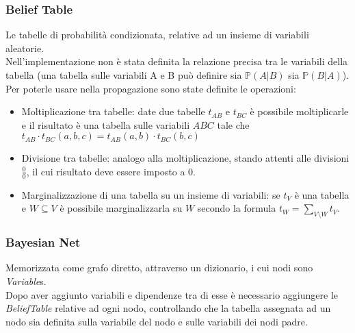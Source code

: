 \documentclass[a4paper]{article}
\begin{document}
\subsubsection{Belief Table}
Le tabelle di probabilità condizionata, relative ad un insieme di variabili aleatorie.\\
Nell'implementazione non è stata definita la relazione precisa tra le variabili della tabella (una tabella sulle variabili A e B può definire sia $\mathbb{P}(A|B)$ sia $\mathbb{P}(B|A)$).\\
Per poterle usare nella propagazione sono state definite le operazioni:
\begin{itemize}
\item Moltiplicazione tra tabelle: date due tabelle $t_{AB}$ e $t_{BC}$ è possibile moltiplicarle e il risultato è una tabella sulle variabili $ABC$ tale che $t_{AB}\cdot t_{BC}(a,b,c)=t_{AB}(a,b)\cdot t_{BC}(b,c)$
\item Divisione tra tabelle: analogo alla moltiplicazione, stando attenti alle divisioni $\frac{0}{0}$, il cui risultato deve essere imposto a 0.
\item Marginalizzazione di una tabella su un insieme di variabili: se $t_V$ è una tabella e $W\subseteq V$ è possibile marginalizzarla su $W$ secondo la formula $t_W = \sum_{V\setminus W}t_V$.
\end{itemize}
\subsubsection{Bayesian Net}
Memorizzata come grafo diretto, attraverso un dizionario, i cui nodi sono \emph{Variable}s.\\
Dopo aver aggiunto variabili e dipendenze tra di esse è necessario aggiungere le \emph{BeliefTable} relative ad ogni nodo, controllando che la tabella assegnata ad un nodo sia definita sulla variabile del nodo e sulle variabili dei nodi padre.
\end{document}
